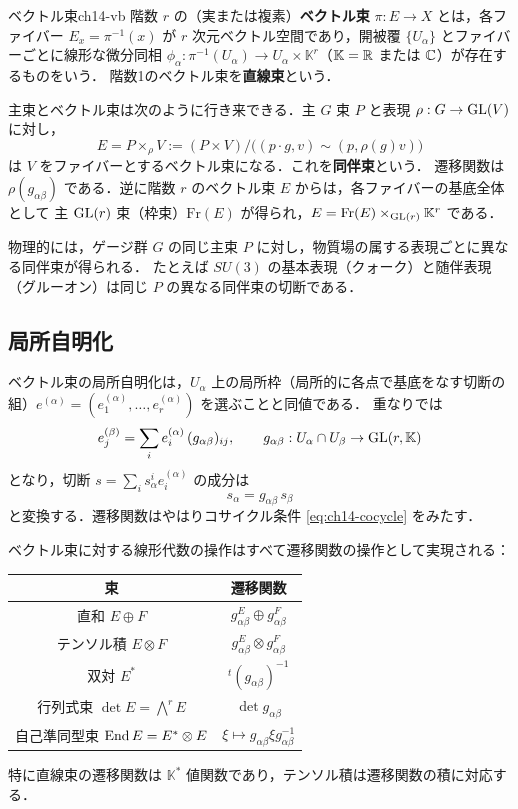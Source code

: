 \begin{mydef}{ベクトル束}{ch14-vb}
階数 $r$ の（実または複素）\textbf{ベクトル束} $\pi:E\to X$ とは，各ファイバー $E_x=\pi^{-1}(x)$ が
$r$ 次元ベクトル空間であり，開被覆 $\{U_\alpha\}$ とファイバーごとに線形な微分同相
$\phi_\alpha:\pi^{-1}(U_\alpha)\to U_\alpha\times\mathbb{K}^r$（$\mathbb{K}=\mathbb{R}$ または $\mathbb{C}$）が存在するものをいう．
階数1のベクトル束を\textbf{直線束}という．
\end{mydef}

主束とベクトル束は次のように行き来できる．主 $G$ 束 $P$ と表現 $\rho:G\to\operatorname{GL}(V)$ に対し，
\begin{equation}
  E = P\times_\rho V := (P\times V)/\bigl((p\cdot g,v)\sim(p,\rho(g)v)\bigr)
\end{equation}
は $V$ をファイバーとするベクトル束になる．これを\textbf{同伴束}という．
遷移関数は $\rho(g_{\alpha\beta})$ である．逆に階数 $r$ のベクトル束 $E$ からは，各ファイバーの基底全体として
主 $\operatorname{GL}(r)$ 束（枠束）$\mathrm{Fr}(E)$ が得られ，$E=\mathrm{Fr}(E)\times_{\operatorname{GL}(r)}\mathbb{K}^r$ である．

物理的には，ゲージ群 $G$ の同じ主束 $P$ に対し，物質場の属する表現ごとに異なる同伴束が得られる．
たとえば $SU(3)$ の基本表現（クォーク）と随伴表現（グルーオン）は同じ $P$ の異なる同伴束の切断である．

\subsection{局所自明化}

ベクトル束の局所自明化は，$U_\alpha$ 上の局所枠（局所的に各点で基底をなす切断の組）$e^{(\alpha)}=(e^{(\alpha)}_1,\dots,e^{(\alpha)}_r)$ を選ぶことと同値である．
重なりでは
\begin{equation}
  e^{(\beta)}_j = \sum_i e^{(\alpha)}_i\,(g_{\alpha\beta})_{ij},\qquad g_{\alpha\beta}:U_\alpha\cap U_\beta\to\operatorname{GL}(r,\mathbb{K})
\end{equation}
となり，切断 $s=\sum_i s_\alpha^i e^{(\alpha)}_i$ の成分は
\begin{equation}
  s_\alpha = g_{\alpha\beta}\,s_\beta
  \label{eq:ch14-section-transform}
\end{equation}
と変換する．遷移関数はやはりコサイクル条件 \eqref{eq:ch14-cocycle} をみたす．

ベクトル束に対する線形代数の操作はすべて遷移関数の操作として実現される：
\begin{center}
\begin{tabular}{c|c}
束 & 遷移関数 \\ \hline
直和 $E\oplus F$ & $g^E_{\alpha\beta}\oplus g^F_{\alpha\beta}$ \\
テンソル積 $E\otimes F$ & $g^E_{\alpha\beta}\otimes g^F_{\alpha\beta}$ \\
双対 $E^*$ & ${}^t(g_{\alpha\beta})^{-1}$ \\
行列式束 $\det E=\bigwedge^r E$ & $\det g_{\alpha\beta}$ \\
自己準同型束 $\operatorname{End} E = E^*\otimes E$ & $\xi\mapsto g_{\alpha\beta}\xi g_{\alpha\beta}^{-1}$
\end{tabular}
\end{center}
特に直線束の遷移関数は $\mathbb{K}^*$ 値関数であり，テンソル積は遷移関数の積に対応する．

